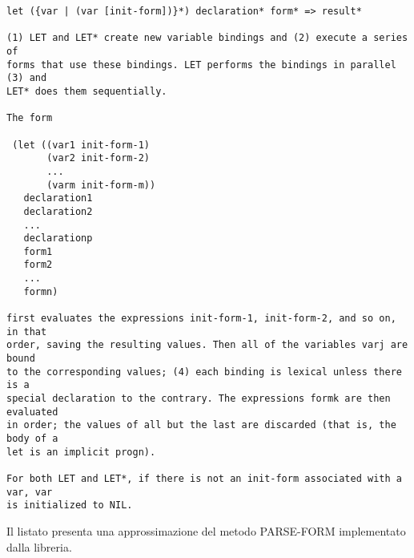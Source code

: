 \begin{lstlisting}
let ({var | (var [init-form])}*) declaration* form* => result*

(1) LET and LET* create new variable bindings and (2) execute a series of
forms that use these bindings. LET performs the bindings in parallel (3) and
LET* does them sequentially.

The form

 (let ((var1 init-form-1)
       (var2 init-form-2)
       ...
       (varm init-form-m))
   declaration1
   declaration2
   ...
   declarationp
   form1
   form2
   ...
   formn)

first evaluates the expressions init-form-1, init-form-2, and so on, in that
order, saving the resulting values. Then all of the variables varj are bound
to the corresponding values; (4) each binding is lexical unless there is a
special declaration to the contrary. The expressions formk are then evaluated
in order; the values of all but the last are discarded (that is, the body of a
let is an implicit progn).

For both LET and LET*, if there is not an init-form associated with a var, var
is initialized to NIL. \end{lstlisting}

Il listato presenta una approssimazione del metodo PARSE-FORM implementato
dalla libreria.

